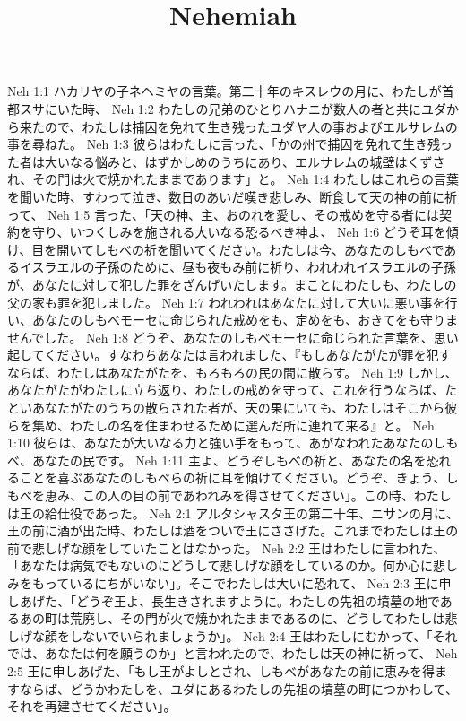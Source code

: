 

\title{Nehemiah}

Neh 1:1  ハカリヤの子ネヘミヤの言葉。第二十年のキスレウの月に、わたしが首都スサにいた時、
Neh 1:2  わたしの兄弟のひとりハナニが数人の者と共にユダから来たので、わたしは捕囚を免れて生き残ったユダヤ人の事およびエルサレムの事を尋ねた。
Neh 1:3  彼らはわたしに言った、「かの州で捕囚を免れて生き残った者は大いなる悩みと、はずかしめのうちにあり、エルサレムの城壁はくずされ、その門は火で焼かれたままであります」と。
Neh 1:4  わたしはこれらの言葉を聞いた時、すわって泣き、数日のあいだ嘆き悲しみ、断食して天の神の前に祈って、
Neh 1:5  言った、「天の神、主、おのれを愛し、その戒めを守る者には契約を守り、いつくしみを施される大いなる恐るべき神よ、
Neh 1:6  どうぞ耳を傾け、目を開いてしもべの祈を聞いてください。わたしは今、あなたのしもべであるイスラエルの子孫のために、昼も夜もみ前に祈り、われわれイスラエルの子孫が、あなたに対して犯した罪をざんげいたします。まことにわたしも、わたしの父の家も罪を犯しました。
Neh 1:7  われわれはあなたに対して大いに悪い事を行い、あなたのしもべモーセに命じられた戒めをも、定めをも、おきてをも守りませんでした。
Neh 1:8  どうぞ、あなたのしもべモーセに命じられた言葉を、思い起してください。すなわちあなたは言われました、『もしあなたがたが罪を犯すならば、わたしはあなたがたを、もろもろの民の間に散らす。
Neh 1:9  しかし、あなたがたがわたしに立ち返り、わたしの戒めを守って、これを行うならば、たといあなたがたのうちの散らされた者が、天の果にいても、わたしはそこから彼らを集め、わたしの名を住まわせるために選んだ所に連れて来る』と。
Neh 1:10  彼らは、あなたが大いなる力と強い手をもって、あがなわれたあなたのしもべ、あなたの民です。
Neh 1:11  主よ、どうぞしもべの祈と、あなたの名を恐れることを喜ぶあなたのしもべらの祈に耳を傾けてください。どうぞ、きょう、しもべを恵み、この人の目の前であわれみを得させてください」。この時、わたしは王の給仕役であった。
Neh 2:1  アルタシャスタ王の第二十年、ニサンの月に、王の前に酒が出た時、わたしは酒をついで王にささげた。これまでわたしは王の前で悲しげな顔をしていたことはなかった。
Neh 2:2  王はわたしに言われた、「あなたは病気でもないのにどうして悲しげな顔をしているのか。何か心に悲しみをもっているにちがいない」。そこでわたしは大いに恐れて、
Neh 2:3  王に申しあげた、「どうぞ王よ、長生きされますように。わたしの先祖の墳墓の地であるあの町は荒廃し、その門が火で焼かれたままであるのに、どうしてわたしは悲しげな顔をしないでいられましょうか」。
Neh 2:4  王はわたしにむかって、「それでは、あなたは何を願うのか」と言われたので、わたしは天の神に祈って、
Neh 2:5  王に申しあげた、「もし王がよしとされ、しもべがあなたの前に恵みを得ますならば、どうかわたしを、ユダにあるわたしの先祖の墳墓の町につかわして、それを再建させてください」。
